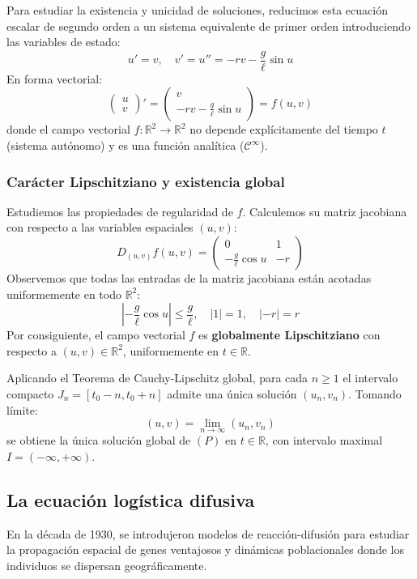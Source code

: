 Para estudiar la existencia y unicidad de soluciones, reducimos esta ecuación escalar de segundo orden a un sistema equivalente de primer orden introduciendo las variables de estado:
\[
    u' = v, \quad v' = u'' = - r v - \frac{g}{\ell} \sin u
\]
En forma vectorial:
\[
    \begin{pmatrix} u \\ v \end{pmatrix}' =
    \begin{pmatrix} v \\ -r v - \frac{g}{\ell} \sin u \end{pmatrix} = f(u, v)
\]
donde el campo vectorial $f: \mathbb{R}^2 \to \mathbb{R}^2$ no depende explícitamente del tiempo $t$ (sistema autónomo) y es una función analítica ($\mathcal{C}^\infty$).

\subsubsection{Carácter Lipschitziano y existencia global}

Estudiemos las propiedades de regularidad de $f$. Calculemos su matriz jacobiana con respecto a las variables espaciales $(u, v)$:
\[
    D_{(u,v)} f(u, v) =
    \begin{pmatrix}
        0 & 1 \\
        -\frac{g}{\ell} \cos u & -r
    \end{pmatrix}
\]
Observemos que todas las entradas de la matriz jacobiana están acotadas uniformemente en todo $\mathbb{R}^2$:
\[
    \left| - \frac{g}{\ell} \cos u \right| \leq \frac{g}{\ell}, \quad |1| = 1, \quad |-r| = r
\]
Por consiguiente, el campo vectorial $f$ es \textbf{globalmente Lipschitziano} con respecto a $(u, v) \in \mathbb{R}^2$, uniformemente en $t \in \mathbb{R}$.

Aplicando el Teorema de Cauchy-Lipschitz global, para cada $n \geq 1$ el intervalo compacto $J_n = [t_0 - n, t_0 + n]$ admite una única solución $(u_n, v_n)$. Tomando límite:
\[
    (u, v) = \lim_{n \to \infty} (u_n, v_n)
\]
se obtiene la única solución global de $(P)$ en $t \in \mathbb{R}$, con intervalo maximal $I = (-\infty, +\infty)$.

\subsection{La ecuación logística difusiva}

En la década de 1930, se introdujeron modelos de reacción-difusión para estudiar la propagación espacial de genes ventajosos y dinámicas poblacionales donde los individuos se dispersan geográficamente.


